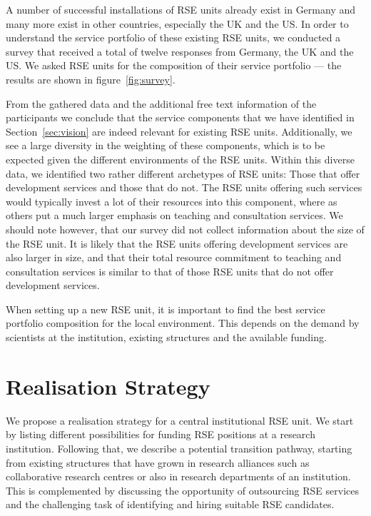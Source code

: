 \documentclass[a4paper]{article}
\begin{document}
A number of successful installations of RSE units already exist in Germany and many more exist in other countries, especially the UK and the US\@.
In order to understand the service portfolio of these existing RSE units, we conducted a survey that received a total of twelve responses from Germany, the UK and the US\@.
We asked RSE units for the composition of their service portfolio --- the results are shown in figure~\ref{fig:survey}.

From the gathered data and the additional free text information of the participants we conclude that the service components that we have identified in Section~\ref{sec:vision} are indeed relevant for existing RSE units.
Additionally, we see a large diversity in the weighting of these components, which is to be expected given the different environments of the RSE units.
Within this diverse data, we identified two rather different archetypes of RSE units: Those that offer development services and those that do not.
The RSE units offering such services would typically invest a lot of their resources into this component, where as others put a much larger emphasis on teaching and consultation services.
We should note however, that our survey did not collect information about the size of the RSE unit.
It is likely that the RSE units offering development services are also larger in size,
and that their total resource commitment to teaching and consultation services is similar to that of those RSE units that do not offer development services.

When setting up a new RSE unit, it is important to find the best service portfolio composition for the local environment.
This depends on the demand by scientists at the institution, existing structures and the available funding.

\section{Realisation Strategy}%
\label{sec:realization}

We propose a realisation strategy for a central institutional RSE unit.
We start by listing different possibilities for funding RSE positions at a research institution.
Following that, we describe a potential transition pathway, starting from existing structures that have grown in research alliances such as collaborative research centres or also in research departments of an institution.
This is complemented by discussing the opportunity of outsourcing RSE services and the challenging task of identifying and hiring suitable RSE candidates.
\end{document}
